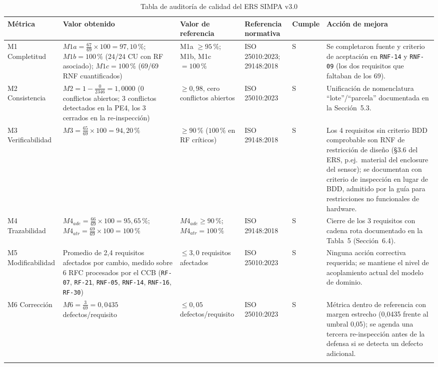 \documentclass[11pt,a4paper]{article}
\newcommand{\id}[1]{\texttt{#1}}
\begin{document}
\begin{longtable}{|L{2.1cm}|L{2.6cm}|L{2.0cm}|L{2.3cm}|C{1.0cm}|L{3.5cm}|}
\hline
{}\textbf{Métrica} & \textbf{Valor obtenido} & \textbf{Valor de referencia} & \textbf{Referencia normativa} & \textbf{Cumple} & \textbf{Acción de mejora} \\ \hline
\endhead
M1 Completitud &
$M1a=\frac{67}{69}\times100=97{,}10\,\%$; $M1b=100\,\%$ (24/24 CU con RF asociado); $M1c=100\,\%$
(69/69 RNF cuantificados) &
M1a $\geq 95\,\%$; M1b, M1c $=100\,\%$ &
ISO 25010:2023; 29148:2018 &
S &
Se completaron fuente y criterio de aceptación en \id{RNF-14} y \id{RNF-09} (los dos requisitos
que faltaban de los 69). \\ \hline
M2 Consistencia &
$M2 = 1-\frac{0}{2346}=1{,}0000$ (0 conflictos abiertos; 3 conflictos detectados en la PE4, los 3
cerrados en la re-inspección) &
$\geq 0{,}98$, cero conflictos abiertos &
ISO 25010:2023 &
S &
Unificación de nomenclatura ``lote''/``parcela'' documentada en la Sección~5.3. \\ \hline
M3 Verificabilidad &
$M3=\frac{65}{69}\times100=94{,}20\,\%$ &
$\geq 90\,\%$ ($100\,\%$ en RF críticos) &
ISO 29148:2018 &
S &
Los 4 requisitos sin criterio BDD comprobable son RNF de restricción de diseño (§3.6 del ERS,
p.ej.\ material del enclosure del sensor); se documentan con criterio de inspección en lugar de
BDD, admitido por la guía para restricciones no funcionales de hardware. \\ \hline
M4 Trazabilidad &
$M4_{ade}=\frac{66}{69}\times100=95{,}65\,\%$; $M4_{atr}=\frac{69}{69}\times100=100\,\%$ &
$M4_{ade}\geq 90\,\%$; $M4_{atr}=100\,\%$ &
ISO 29148:2018 &
S &
Cierre de los 3 requisitos con cadena rota documentado en la Tabla~5 (Sección~6.4). \\ \hline
M5 Modificabilidad &
Promedio de 2{,}4 requisitos afectados por cambio, medido sobre 6 RFC procesados por el CCB
(\id{RF-07}, \id{RF-21}, \id{RNF-05}, \id{RNF-14}, \id{RNF-16}, \id{RF-30}) &
$\leq 3{,}0$ requisitos afectados &
ISO 25010:2023 &
S &
Ninguna acción correctiva requerida; se mantiene el nivel de acoplamiento actual del modelo de
dominio. \\ \hline
M6 Corrección &
$M6=\frac{3}{69}=0{,}0435$ defectos/requisito &
$\leq 0{,}05$ defectos/requisito &
ISO 25010:2023 &
S &
Métrica dentro de referencia con margen estrecho (0,0435 frente al umbral 0,05); se agenda una
tercera re-inspección antes de la defensa si se detecta un defecto adicional. \\ \hline
\caption{Tabla de auditoría de calidad del ERS SIMPA v3.0}
\label{tab:auditoria}
\end{longtable}
\end{document}
